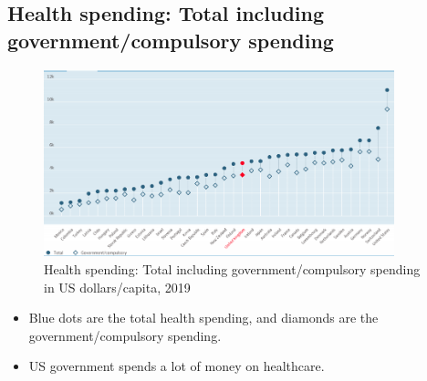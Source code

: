         \subsection{Health spending: Total including government/compulsory 
spending}

            \begin{figure}[H]%
                \centering
                \includegraphics[width=4in]{images/ch3/2 Government.png}
                \caption{Health spending: Total including government/compulsory 
spending in US dollars/capita, 2019}
                \label{fig:label}
            \end{figure}      
\begin{itemize}
        \item Blue dots are the total health spending, and diamonds are the government/compulsory spending. 
        \item US government spends a lot of money on healthcare.
        \end{itemize}
        
